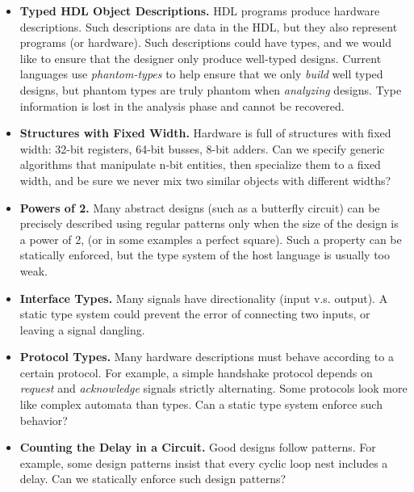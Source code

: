 \documentclass[10pt,twoside]{article}
\begin{document}
\begin{itemize}

\item{\bf Typed HDL Object Descriptions.} HDL programs produce
hardware descriptions. Such descriptions are data in the HDL, but
they also represent programs (or hardware). Such descriptions could
have types, and we would like to ensure that the designer only
produce well-typed designs. Current languages use {\em phantom-types}
\cite{Hinze:03:Phantom,fluet-02,Leijen:2000:DSE} to help ensure that we only {\em build} well typed designs,
but phantom types are truly phantom when {\em analyzing} designs.
Type information is lost in the analysis phase and cannot be
recovered.

\item{\bf Structures with Fixed Width.}
Hardware is full of structures with fixed width: 32-bit registers,
64-bit busses, 8-bit adders. Can we specify generic algorithms that
manipulate n-bit entities, then specialize them to a fixed width, and be
sure we never mix two similar objects with different widths?

\item{\bf Powers of 2.} Many abstract designs (such as a butterfly
circuit) can be precisely described using regular patterns only
when the size of the design is a power of 2, (or in some examples
a perfect square). Such a property can be statically enforced, but
the type system of the host language is usually too weak.

\item{\bf Interface Types.} Many signals have directionality
(input v.s. output). A static type system could prevent the error
of connecting two inputs, or leaving a signal dangling.

\item{\bf Protocol Types.} Many hardware descriptions must behave
according to a certain protocol. For example, a simple
handshake protocol depends on {\em request} and {\em acknowledge}
signals strictly alternating. Some protocols look more like
complex automata than types. Can a static type system enforce
such behavior?

\item{\bf Counting the Delay in a Circuit.} Good designs follow patterns.
For example, some design patterns insist that every cyclic loop nest
includes a delay. Can we statically enforce such design patterns?

\end{itemize}
\end{document}
